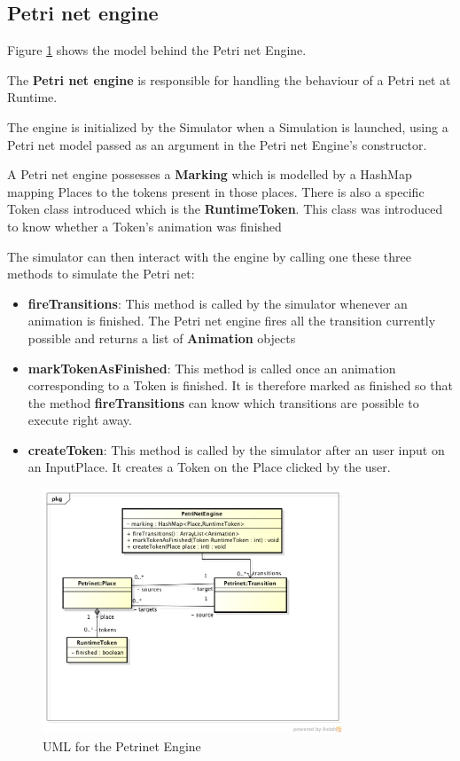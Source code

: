 \subsection{Petri net engine}

Figure \ref{fig:uml-petrinet-engine} shows the model behind the Petri net Engine.

The \textbf{Petri net engine} is responsible for handling the behaviour of a Petri net at Runtime. 

The engine is initialized by the Simulator when a Simulation is launched, using a Petri net model passed as an argument in the Petri net Engine's constructor.

A Petri net engine possesses a \textbf{Marking} which is modelled by a HashMap mapping Places to the tokens present in those places.
There is also a specific Token class introduced which is the \textbf{RuntimeToken}. This class was introduced to know whether a Token's animation was finished 

The simulator can then interact with the engine by calling one these three methods to simulate the Petri net:

\begin{itemize}
  \item \textbf{fireTransitions}: This method is called by the simulator whenever an animation is finished. The Petri net engine fires all the transition currently possible and returns a list of \textbf{Animation} objects
  \item \textbf{markTokenAsFinished}: This method is called once an animation corresponding to a Token is finished. It is therefore marked as finished so that the method \textbf{fireTransitions} can know which transitions are possible to execute right away.
  \item \textbf{createToken}: This method is called by the simulator after an user input on an InputPlace. It creates a Token on the Place clicked by the user.
\end{itemize}
 
\begin{figure}[htp]
\begin{center}
  \includegraphics[width=0.8\textwidth]{image/petrinet_engine.png}
  \caption{UML for the Petrinet Engine}
  \label{fig:uml-petrinet-engine}
\end{center}
\end{figure}


 

